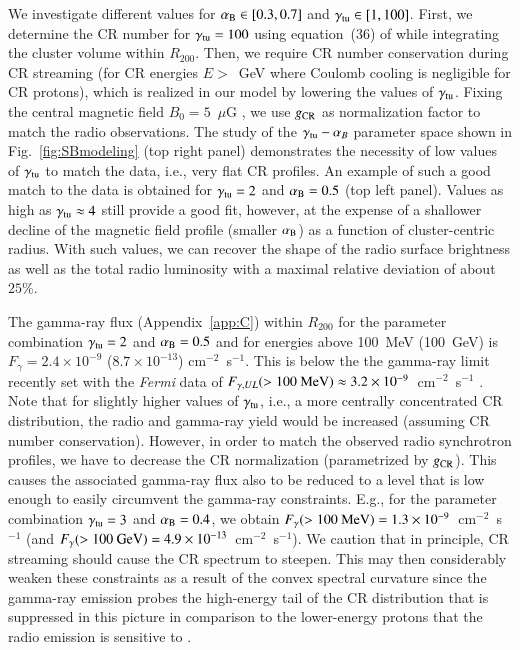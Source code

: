 \documentclass[useAMS,usenatbib]{mn2e}
\begin{document}
We investigate different values for $\alpha_{{\mathrm{B}}}\in [0.3,0.7]$ and
$\gamma_{{\mathrm{tu}}}\in [1,100]$. First, we determine the CR number for
$\gamma_{{\mathrm{tu}}}=100$ using equation~(36) of \cite{2011A&A...527A..99E} while
integrating the cluster volume within $R_{200}$. Then, we require CR number
conservation during CR streaming (for CR energies $E>$~GeV where Coulomb cooling
is negligible for CR protons), which is realized in our model by lowering the
values of $\gamma_{{\mathrm{tu}}}$. Fixing the central magnetic field
$B_{0}=5$~$\mu$G \citep{2010A&A...513A..30B}, we use $g_{{\mathrm{CR}}}$ as
normalization factor to match the radio observations.  The study of the
$\gamma_{{\mathrm{tu}}}-\alpha_{B}$ parameter space shown in
Fig.~\ref{fig:SBmodeling} (top right panel) demonstrates the necessity of low
values of $\gamma_{{\mathrm{tu}}}$ to match the data, i.e., very flat CR profiles. An
example of such a good match to the data is obtained for $\gamma_{{\mathrm{tu}}}=2$
and $\alpha_{{\mathrm{B}}}=0.5$ (top left panel). Values as high as
$\gamma_{{\mathrm{tu}}} \approx 4$ still provide a good fit, however, at the expense
of a shallower decline of the magnetic field profile (smaller $ \alpha_{{\mathrm{B}}}$) as a
function of cluster-centric radius. With such values, we can recover the shape
of the radio surface brightness as well as the total radio luminosity with a
maximal relative deviation of about $25\%$.

The gamma-ray flux (Appendix~\ref{app:C}) within $R_{200}$ for the parameter
combination $\gamma_{{\mathrm{tu}}} = 2$ and $\alpha_{{\mathrm{B}}}=0.5$ and for energies
above 100~MeV (100~GeV) is $F_{\gamma} = 2.4 \times 10^{-9}$ ($8.7 \times
10^{-13}$) cm$^{-2}$~s$^{-1}$. This is below the the gamma-ray limit recently
set with the \emph{Fermi} data of $F_{\gamma, UL} (>100~{\mathrm{MeV}}) \approx 3.2
\times 10^{-9}$~cm$^{-2}$~s$^{-1}$ \citep{2012...VERITAS}.  Note that for
slightly higher values of $\gamma_{{\mathrm{tu}}}$, i.e., a more centrally
concentrated CR distribution, the radio and gamma-ray yield would be increased
(assuming CR number conservation). However, in order to match the observed radio
synchrotron profiles, we have to decrease the CR normalization (parametrized by
$g_{{\mathrm{CR}}}$). This causes the associated gamma-ray flux also to be reduced to
a level that is low enough to easily circumvent the gamma-ray constraints. E.g.,
for the parameter combination $\gamma_{{\mathrm{tu}}} = 3$ and
$\alpha_{{\mathrm{B}}}=0.4$, we obtain $F_{\gamma} (>100~{\mathrm{MeV}}) = 1.3 \times
10^{-9}$~cm$^{-2}$~s$^{-1}$ (and $F_{\gamma} (>100~{\mathrm{GeV}}) = 4.9 \times
10^{-13}$~cm$^{-2}$~s$^{-1}$).  We caution that in principle, CR streaming
should cause the CR spectrum to steepen.  This may then considerably weaken
these constraints as a result of the convex spectral curvature since the
gamma-ray emission probes the high-energy tail of the CR distribution that is
suppressed in this picture in comparison to the lower-energy protons that the
radio emission is sensitive to \citep[see][for an extended discussion of this
point]{2011arXiv1111.5544M}.
\end{document}
